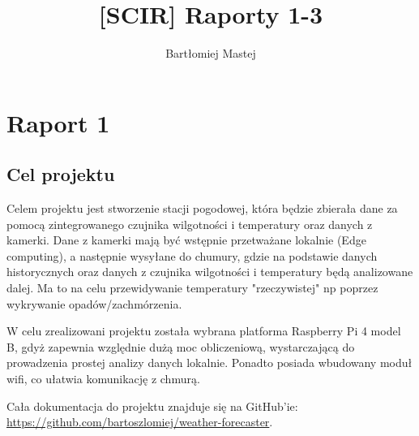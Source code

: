 \documentclass[runningheads]{llncs}
\begin{document}
%
\title{[SCIR] Raporty 1-3}
%

\author{Bartłomiej Mastej}
%
%

%
\maketitle              %
%
%
%
%
\section{Raport 1}
\subsection{Cel projektu}
Celem projektu jest stworzenie stacji pogodowej, która będzie zbierała dane za pomocą zintegrowanego czujnika wilgotności i temperatury oraz danych z kamerki.
Dane z kamerki mają być wstępnie przetważane lokalnie (Edge computing), a następnie wysyłane do chumury, gdzie na podstawie danych historycznych oraz danych z czujnika wilgotności i temperatury będą analizowane dalej. Ma to na celu przewidywanie temperatury "rzeczywistej" np poprzez wykrywanie opadów/zachmórzenia.

W celu zrealizowani projektu została wybrana platforma Raspberry Pi 4 model B, gdyż zapewnia względnie dużą moc obliczeniową, wystarczającą do prowadzenia prostej analizy danych lokalnie. Ponadto posiada wbudowany moduł wifi, co ułatwia komunikację z chmurą.

Cała dokumentacja do projektu znajduje się na GitHub'ie: \url{https://github.com/bartoszlomiej/weather-forecaster}.
\end{document}
